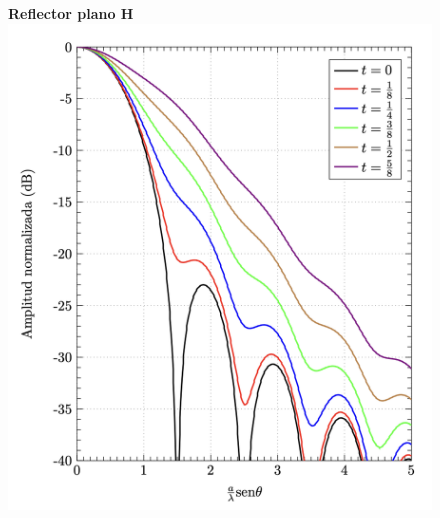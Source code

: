 \documentclass[twocolumn, 8pt]{extarticle}
\begin{document}
\begin{multicols}{2}
    \begin{figure}[H]
        \centering
        \textbf{Reflector plano H}
        \includegraphics[width=\columnwidth]{reflector_plano_h.png}
    \end{figure}
\end{multicols}
\end{document}
